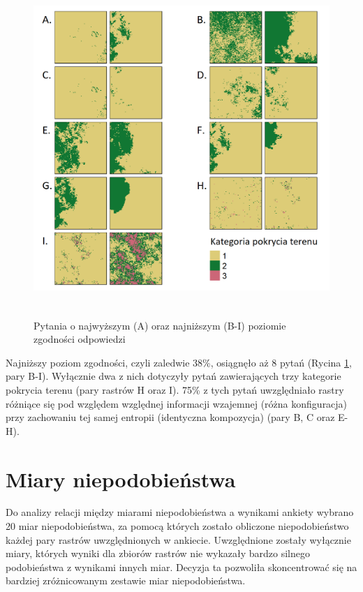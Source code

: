 \documentclass{amuthesis}
\begin{document}
\begin{figure}[t]

{\centering \includegraphics[width=5.20833in,height=5in]{figures/pyt_zgodnosc2_kopia.png}

}

\caption{\label{fig-pyt_zgodnosc2_kopia}Pytania o najwyższym (A) oraz
najniższym (B-I) poziomie zgodności odpowiedzi}

\end{figure}

Najniższy poziom zgodności, czyli zaledwie 38\%, osiągnęło aż 8 pytań
(Rycina \ref{fig-pyt_zgodnosc2_kopia}, pary B-I). Wyłącznie dwa z nich
dotyczyły pytań zawierających trzy kategorie pokrycia terenu (pary
rastrów H oraz I). 75\% z tych pytań uwzględniało rastry różniące się
pod względem względnej informacji wzajemnej (różna konfiguracja) przy
zachowaniu tej samej entropii (identyczna kompozycja) (pary B, C oraz
E-H).

\hypertarget{miary-niepodobieux144stwa}{%
\section{Miary niepodobieństwa}\label{miary-niepodobieux144stwa}}

Do analizy relacji między miarami niepodobieństwa a wynikami ankiety
wybrano 20 miar niepodobieństwa, za pomocą których zostało obliczone
niepodobieństwo każdej pary rastrów uwzględnionych w ankiecie.
Uwzględnione zostały wyłącznie miary, których wyniki dla zbiorów rastrów
nie wykazały bardzo silnego podobieństwa z wynikami innych miar. Decyzja
ta pozwoliła skoncentrować się na bardziej zróżnicowanym zestawie miar
niepodobieństwa.
\end{document}
